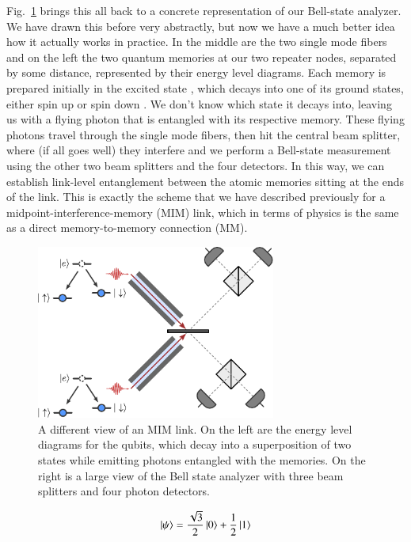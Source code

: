 Fig.~\ref{fig:13-MIM-energy} brings this all back to a concrete representation of our Bell-state analyzer. We have drawn this before very abstractly, but now we have a much better idea how it actually works in practice. In the middle are the two single mode fibers and on the left the two quantum memories at our two repeater nodes, separated by some distance, represented by their energy level diagrams. Each memory is prepared initially in the excited state , which decays into one of its ground states, either spin up \ket{\uparrow} or spin down \ket{\downarrow}. We don't know which state it decays into, leaving us with a flying photon that is entangled with its respective memory. These flying photons travel through the single mode fibers, then hit the central beam splitter, where (if all goes well) they interfere and we perform a Bell-state measurement using the other two beam splitters and the four detectors. In this way, we can establish link-level entanglement between the atomic memories sitting at the ends of the link. This is exactly the scheme that we have described previously for a midpoint-interference-memory (MIM) link, which in terms of physics is the same as a direct memory-to-memory connection (MM).

\begin{figure}[t]
    \centering
    \includegraphics[width=0.7\textwidth]{lesson13/13-4_MIM_with_energy_levels.pdf}
    \caption[MIM with energy levels]{A different view of an MIM link. On the left are the energy level diagrams for the qubits, which decay into a superposition of two states while emitting photons entangled with the memories. On the right is a large view of the Bell state analyzer with three beam splitters and four photon detectors.}
    \label{fig:13-MIM-energy}
\end{figure}




\newpage
\begin{exercises}
\begin{equation*}
\left| \psi \right\rangle = \frac{\sqrt{3}}{2}\left| 0 \right\rangle + \frac{1}{2}\left| 1 \right\rangle
\end{equation*}


\end{exercises}

